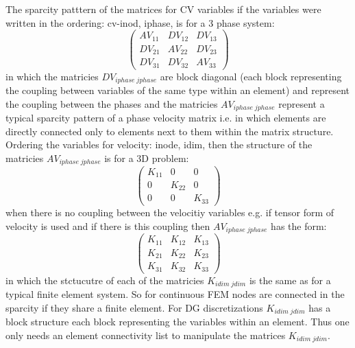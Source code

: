 The sparcity patttern of the matrices for CV variables if the variables were written 
in the ordering: cv-inod, iphase, is for a 3 phase system:
\begin{equation}
  \begin{pmatrix}
AV_{11}  &  DV_{12}  &  DV_{13} \\ 
DV_{21}  &  AV_{22}  &  DV_{23} \\
DV_{31}  &  DV_{32}  &  AV_{33} 
  \end{pmatrix}
\label{Vel-mat-spar}
\end{equation}
in which the matricies $DV_{iphase\; jphase}$ are block diagonal (each block representing 
the coupling between variables of the same type within an element) and represent the 
coupling between the phases and the matricies $AV_{iphase\; jphase}$ represent 
a typical sparcity pattern of a phase velocity matrix i.e. in which elements are 
directly connected only to elements next to them within the matrix structure. 
Ordering the variables for velocity: inode, idim, then the structure of the matricies $AV_{iphase\; jphase}$ is 
for a 3D problem:
\begin{equation}
  \begin{pmatrix}
K_{11}  &  0  &  0 \\ 
0 &  K_{22}  &  0 \\
0  &  0  &  K_{33} 
  \end{pmatrix}
\label{Vel-1phase-mat-spar}
\end{equation}
when there is no coupling between the velocitiy variables e.g. if tensor form of velocity is used and 
if there is this coupling then  $AV_{iphase\;jphase}$ has the form: 
\begin{equation}
  \begin{pmatrix}
K_{11}  &  K_{12}  &  K_{13} \\ 
K_{21}  &  K_{22}  &  K_{23} \\ 
K_{31}  &  K_{32}  &  K_{33}  
  \end{pmatrix}
\label{Vel-1phase-stress-mat-spar}
\end{equation}
in which the stctucutre of each of the matricies $K_{idim\; jdim}$ is the same as 
for a typical finite element system. So for continuous FEM nodes are connected in the sparcity 
if they share a finite element. For DG discretizations $K_{idim\; jdim}$ has a block structure 
each block representing the variables within an element. Thus one only needs an element connectivity 
list to manipulate the matrices $K_{idim\; jdim}$. 


